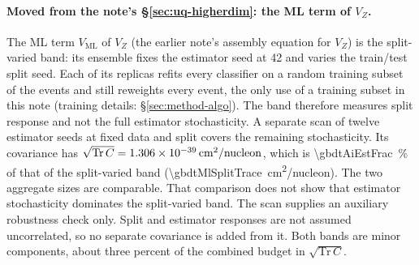 \paragraph{Moved from the note's \S\ref{sec:uq-higherdim}: the ML term of $V_Z$.} The ML term $V_{\mathrm{ML}}$ of $V_Z$ (the earlier note's assembly equation for $V_Z$) is the split-varied band: its ensemble fixes the estimator seed at 42 and varies the train/test split seed. Each of its replicas refits every classifier on a random training subset of the events and still reweights every event, the only use of a training subset in this note (training details: \S\ref{sec:method-algo}). The band therefore measures split response and not the full estimator stochasticity. A separate scan of twelve estimator seeds at fixed data and split covers the remaining stochasticity. Its covariance has $\sqrt{\mathrm{Tr}\,C}=\SI{1.306e-39}{cm^2/nucleon}$, which is \SI{\gbdtAiEstFrac}{\percent} of that of the split-varied band (\SI{\gbdtMlSplitTrace}{cm^2/nucleon}). The two aggregate sizes are comparable. That comparison does not show that estimator stochasticity dominates the split-varied band. The scan supplies an auxiliary robustness check only. Split and estimator responses are not assumed uncorrelated, so no separate covariance is added from it. Both bands are minor components, about three percent of the combined budget in $\sqrt{\mathrm{Tr}\,C}$.

